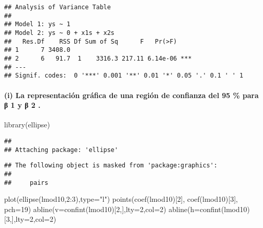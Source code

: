 \documentclass[
]{article}
\newenvironment{Shaded}{\begin{snugshade}}{\end{snugshade}}
\newcommand{\AttributeTok}[1]{\textcolor[rgb]{0.77,0.63,0.00}{#1}}
\newcommand{\DecValTok}[1]{\textcolor[rgb]{0.00,0.00,0.81}{#1}}
\newcommand{\FunctionTok}[1]{\textcolor[rgb]{0.00,0.00,0.00}{#1}}
\newcommand{\NormalTok}[1]{#1}
\newcommand{\SpecialCharTok}[1]{\textcolor[rgb]{0.00,0.00,0.00}{#1}}
\newcommand{\StringTok}[1]{\textcolor[rgb]{0.31,0.60,0.02}{#1}}
\begin{document}
\begin{verbatim}
## Analysis of Variance Table
## 
## Model 1: ys ~ 1
## Model 2: ys ~ 0 + x1s + x2s
##   Res.Df    RSS Df Sum of Sq      F   Pr(>F)    
## 1      7 3408.0                                 
## 2      6   91.7  1    3316.3 217.11 6.14e-06 ***
## ---
## Signif. codes:  0 '***' 0.001 '**' 0.01 '*' 0.05 '.' 0.1 ' ' 1
\end{verbatim}

\hypertarget{i-la-representaciuxf3n-gruxe1fica-de-una-regiuxf3n-de-confianza-del-95-para-ux3b2-1-y-ux3b2-2-.}{%
\paragraph{(i) La representación gráfica de una región de confianza del
95 \% para β 1 y β 2
.}\label{i-la-representaciuxf3n-gruxe1fica-de-una-regiuxf3n-de-confianza-del-95-para-ux3b2-1-y-ux3b2-2-.}}

\begin{Shaded}
\begin{Highlighting}[]
\FunctionTok{library}\NormalTok{(ellipse)}
\end{Highlighting}
\end{Shaded}

\begin{verbatim}
## 
## Attaching package: 'ellipse'
\end{verbatim}

\begin{verbatim}
## The following object is masked from 'package:graphics':
## 
##     pairs
\end{verbatim}

\begin{Shaded}
\begin{Highlighting}[]
\FunctionTok{plot}\NormalTok{(}\FunctionTok{ellipse}\NormalTok{(lmod10,}\DecValTok{2}\SpecialCharTok{:}\DecValTok{3}\NormalTok{),}\AttributeTok{type=}\StringTok{"l"}\NormalTok{)}
\FunctionTok{points}\NormalTok{(}\FunctionTok{coef}\NormalTok{(lmod10)[}\DecValTok{2}\NormalTok{], }\FunctionTok{coef}\NormalTok{(lmod10)[}\DecValTok{3}\NormalTok{], }\AttributeTok{pch=}\DecValTok{19}\NormalTok{)}
\FunctionTok{abline}\NormalTok{(}\AttributeTok{v=}\FunctionTok{confint}\NormalTok{(lmod10)[}\DecValTok{2}\NormalTok{,],}\AttributeTok{lty=}\DecValTok{2}\NormalTok{,}\AttributeTok{col=}\DecValTok{2}\NormalTok{)}
\FunctionTok{abline}\NormalTok{(}\AttributeTok{h=}\FunctionTok{confint}\NormalTok{(lmod10)[}\DecValTok{3}\NormalTok{,],}\AttributeTok{lty=}\DecValTok{2}\NormalTok{,}\AttributeTok{col=}\DecValTok{2}\NormalTok{)}
\end{Highlighting}
\end{Shaded}
\end{document}
